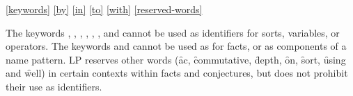 \ref{keywords}
\ref{by}
\ref{in}
\ref{to}
\ref{with}
\ref{reserved-words}

The keywords , , , , , , and
 cannot be used as identifiers for sorts, variables, or operators.
\p
The keywords  and  cannot be used as
 for facts, or as components of a name pattern.
\p
LP reserves other words (\f{ac}, \f{commutative}, \f{depth}, \f{on}, \f{sort},
\f{using} and \f{well}) in certain contexts within facts and conjectures, but
does not prohibit their use as identifiers.
